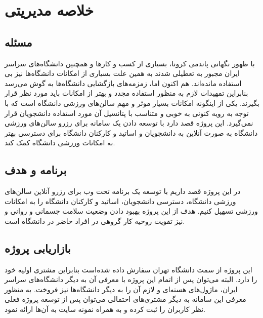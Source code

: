 \section{
	خلاصه مدیریتی
}

\subsection{
مسئله
}
با ظهور نگهانی پاندمی کرونا، بسیاری از کسب و کار‌ها و همچنین دانشگاه‌های سراسر ایران مجبور به تعطیلی شدند به همین علت بسیاری از امکانات دانشگاه‌ها نیز بی استفاده مانده‌اند. هم اکنون اما، زمزمه‌های بازگشایی دانشگاه‌ها به گوش می‌رسد بنابراین تمهیدات لازم به منظور استفاده مجدد و بهتر از امکانات باید مورد نظر قرار بگیرند. یکی از اینگونه امکانات بسیار موثر و مهم سالن‌های ورزشی دانشگاه است که با توجه به رویه کنونی به خوبی و متناسب با پتانسیل آن مورد استفاده دانشجویان قرار نمی‌گیرد. این پروژه قصد دارد با توسعه دادن یک سامانه برای رزرو سالن‌های ورزشی دانشگاه به صورت آنلاین به دانشجویان و اساتید و کارکنان دانشگاه برای دسترسی بهتر به امکانات ورزشی دانشگاه کمک کند.


\subsection{
برنامه و هدف
}
در این پروژه قصد داریم با توسعه یک برنامه تحت وب برای رزرو آنلاین سالن‌های ورزشی دانشگاه، دسترسی دانشجویان، اساتید و کارکنان دانشگاه را به امکانات ورزشی تسهیل کنیم. هدف از این پروژه بهبود دادن وضعیت سلامت جسمانی و روانی و نیز تقویت روحیه کار گروهی در افراد حاضر در دانشگاه است.


\subsection{
بازاریابی پروژه
}
این پروژه از سمت دانشگاه تهران سفارش داده شده‌است بنابراین مشتری اولیه خود را دارد. البته می‌توان پس از اتمام این پروژه با معرفی آن به دیگر دانشگاه‌های سراسر ایران، ماژول‌های هسته‌ای و لازم آن را به دیگر دانشگاه‌ها نیز فروخت. به منظور معرفی این سامانه به دیگر مشتری‌های احتمالی می‌توان پس از توسعه پروژه فعلی نظر کاربران را ثبت کرده و به همراه نمونه‌ سایت به آن‌ها ارائه نمود.